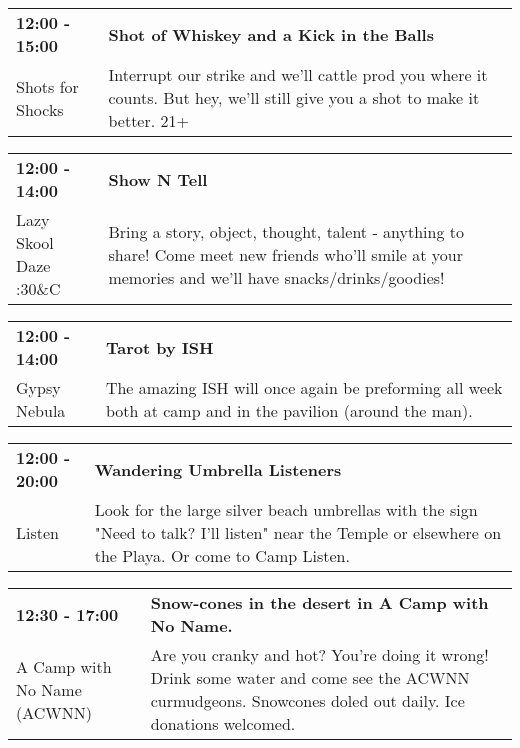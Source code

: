 \begin{tabular}{ p{1in} p{2.2in} }
    \textbf{12:00 - 15:00} & \textbf{Shot of Whiskey and a Kick in the Balls} \\
    Shots for Shocks \newline  & Interrupt our strike and we'll cattle prod you where it counts. But hey, we'll still give you a shot to make it better. 21+ \\
    \hline 
\end{tabular}
    
\begin{tabular}{ p{1in} p{2.2in} }
    \textbf{12:00 - 14:00} & \textbf{Show N Tell} \\
    Lazy Skool Daze \newline 4:30\&C & Bring a story, object, thought, talent - anything to share! Come meet new friends who'll smile at your memories and we'll have snacks/drinks/goodies! \\
    \hline 
\end{tabular}
    
\begin{tabular}{ p{1in} p{2.2in} }
    \textbf{12:00 - 14:00} & \textbf{Tarot by ISH} \\
    Gypsy Nebula \newline  & The amazing ISH will once again be preforming all week both at camp and in the pavilion (around the man). \\
    \hline 
\end{tabular}
    
\begin{tabular}{ p{1in} p{2.2in} }
    \textbf{12:00 - 20:00} & \textbf{Wandering Umbrella Listeners} \\
    Listen \newline  & Look for the large silver beach umbrellas with the sign "Need to talk? I'll listen" near the Temple or elsewhere on the Playa. Or come to Camp Listen. \\
    \hline 
\end{tabular}
    
\begin{tabular}{ p{1in} p{2.2in} }
    \textbf{12:30 - 17:00} & \textbf{Snow-cones in the desert in A Camp with No Name.} \\
    A Camp with No Name (ACWNN) \newline  & Are you cranky and hot? You're doing it wrong! Drink some water and come see the ACWNN curmudgeons. Snowcones doled out daily. Ice donations welcomed. \\
    \hline 
\end{tabular}
    
